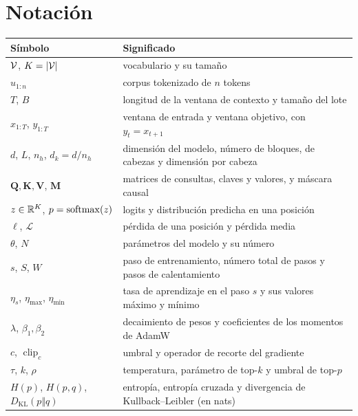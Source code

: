 \documentclass[11pt,a4paper,twoside,openany]{book}
\newcommand{\clip}{\operatorname{clip}}
\newcommand{\KL}{D_{\mathrm{KL}}}
\newcommand{\Qm}{\bm{Q}}
\newcommand{\Km}{\bm{K}}
\newcommand{\Vm}{\bm{V}}
\newcommand{\Mm}{\bm{M}}
\begin{document}
\section*{Notación}
\begin{center}\small
\begin{tabularx}{\textwidth}{@{}l>{\raggedright\arraybackslash}X@{}}
\toprule
Símbolo & Significado \\
\midrule
$\mathcal{V}$, $K=\lvert\mathcal{V}\rvert$ & vocabulario y su tamaño \\
$u_{1:n}$ & corpus tokenizado de $n$ tokens \\
$T$, $B$ & longitud de la ventana de contexto y tamaño del lote \\
$x_{1:T}$, $y_{1:T}$ & ventana de entrada y ventana objetivo, con $y_t=x_{t+1}$ \\
$d$, $L$, $n_h$, $d_k=d/n_h$ & dimensión del modelo, número de bloques, de cabezas y dimensión por cabeza \\
$\Qm,\Km,\Vm$, $\Mm$ & matrices de consultas, claves y valores, y máscara causal \\
$z\in\mathbb{R}^{K}$, $p=\operatorname{softmax}(z)$ & logits y distribución predicha en una posición \\
$\ell$, $\mathcal{L}$ & pérdida de una posición y pérdida media \\
$\theta$, $N$ & parámetros del modelo y su número \\
$s$, $S$, $W$ & paso de entrenamiento, número total de pasos y pasos de calentamiento \\
$\eta_s$, $\eta_{\max}$, $\eta_{\min}$ & tasa de aprendizaje en el paso $s$ y sus valores máximo y mínimo \\
$\lambda$, $\beta_1,\beta_2$ & decaimiento de pesos y coeficientes de los momentos de AdamW \\
$c$, $\clip_c$ & umbral y operador de recorte del gradiente \\
$\tau$, $k$, $\rho$ & temperatura, parámetro de top-$k$ y umbral de top-$p$ \\
$H(p)$, $H(p,q)$, $\KL(p\Vert q)$ & entropía, entropía cruzada y divergencia de Kullback--Leibler (en nats) \\
\bottomrule
\end{tabularx}
\end{center}


\tableofcontents

\mainmatter






\backmatter

\end{document}
